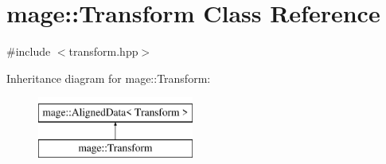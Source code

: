 \hypertarget{classmage_1_1_transform}{}\section{mage\+:\+:Transform Class Reference}
\label{classmage_1_1_transform}


{\ttfamily \#include $<$transform.\+hpp$>$}

Inheritance diagram for mage\+:\+:Transform\+:\begin{figure}[H]
\begin{center}
\leavevmode
\includegraphics[height=2.000000cm]{classmage_1_1_transform}
\end{center}
\end{figure}

